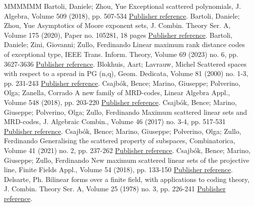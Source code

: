 \begin{thebibliography}{MMMMMM}
 Bartoli, Daniele; Zhou, Yue Exceptional scattered polynomials, J. Algebra, Volume 509 (2018), pp. 507-534 \href{https://alco.centre-mersenne.org/articles/10.5802/alco.377/#bartoli2018exceptional}{Publisher reference}.
 Bartoli, Daniele; Zhou, Yue Asymptotics of Moore exponent sets, J. Combin. Theory Ser. A, Volume 175 (2020), Paper no. 105281, 18 pages \href{https://alco.centre-mersenne.org/articles/10.5802/alco.377/#BARTOLI2020105281}{Publisher reference}.
 Bartoli, Daniele; Zini, Giovanni; Zullo, Ferdinando Linear maximum rank distance codes of exceptional type, IEEE Trans. Inform. Theory, Volume 69 (2023) no. 6, pp. 3627-3636 \href{https://alco.centre-mersenne.org/articles/10.5802/alco.377/#bartoli2021linear}{Publisher reference}.
 Blokhuis, Aart; Lavrauw, Michel Scattered spaces with respect to a spread in  PG (n,q), Geom. Dedicata, Volume 81 (2000) no. 1-3, pp. 231-243 \href{https://alco.centre-mersenne.org/articles/10.5802/alco.377/#blokhuis2000scattered}{Publisher reference}.
 Csajbók, Bence; Marino, Giuseppe; Polverino, Olga; Zanella, Corrado A new family of MRD-codes, Linear Algebra Appl., Volume 548 (2018), pp. 203-220 \href{https://alco.centre-mersenne.org/articles/10.5802/alco.377/#csajbok2018new}{Publisher reference}.
 Csajbók, Bence; Marino, Giuseppe; Polverino, Olga; Zullo, Ferdinando Maximum scattered linear sets and MRD-codes, J. Algebraic Combin., Volume 46 (2017) no. 3-4, pp. 517-531 \href{https://alco.centre-mersenne.org/articles/10.5802/alco.377/#csajbok2017maximum}{Publisher reference}.
 Csajbók, Bence; Marino, Giuseppe; Polverino, Olga; Zullo, Ferdinando Generalising the scattered property of subspaces, Combinatorica, Volume 41 (2021) no. 2, pp. 237-262 \href{https://alco.centre-mersenne.org/articles/10.5802/alco.377/#csajbok2021generalising}{Publisher reference}.
 Csajbók, Bence; Marino, Giuseppe; Zullo, Ferdinando New maximum scattered linear sets of the projective line, Finite Fields Appl., Volume 54 (2018), pp. 133-150 \href{https://alco.centre-mersenne.org/articles/10.5802/alco.377/#csajbok2018new2}{Publisher reference}.
 Delsarte, Ph. Bilinear forms over a finite field, with applications to coding theory, J. Combin. Theory Ser. A, Volume 25 (1978) no. 3, pp. 226-241 \href{https://alco.centre-mersenne.org/articles/10.5802/alco.377/#delsarte1978bilinear}{Publisher reference}.

\end{thebibliography}
